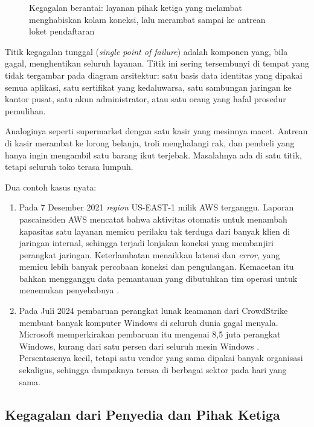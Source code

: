 \begin{figure}[!htb]
  \centering
  
  \caption{Kegagalan berantai: layanan pihak ketiga yang melambat menghabiskan kolam koneksi, lalu
           merambat sampai ke antrean loket pendaftaran}
  \label{fig:ch12-kegagalan-berantai}
\end{figure}

Titik kegagalan tunggal (\textit{single point of failure}) adalah komponen yang, bila gagal,
menghentikan seluruh layanan. Titik ini sering tersembunyi di tempat yang tidak tergambar pada
diagram arsitektur: satu basis data identitas yang dipakai semua aplikasi, satu sertifikat yang
kedaluwarsa, satu sambungan jaringan ke kantor pusat, satu akun administrator, atau satu orang yang
hafal prosedur pemulihan.

Analoginya seperti supermarket dengan satu kasir yang mesinnya macet. Antrean di kasir merambat ke
lorong belanja, troli menghalangi rak, dan pembeli yang hanya ingin mengambil satu barang ikut
terjebak. Masalahnya ada di satu titik, tetapi seluruh toko terasa lumpuh.

Dua contoh kasus nyata:
\begin{enumerate}
  \item Pada 7 Desember 2021 \textit{region} US-EAST-1 milik AWS terganggu. Laporan pascainsiden
        AWS mencatat bahwa aktivitas otomatis untuk menambah kapasitas satu layanan memicu
        perilaku tak terduga dari banyak klien di jaringan internal, sehingga terjadi lonjakan
        koneksi yang membanjiri perangkat jaringan. Keterlambatan menaikkan latensi dan
        \textit{error}, yang memicu lebih banyak percobaan koneksi dan pengulangan. Kemacetan itu
        bahkan mengganggu data pemantauan yang dibutuhkan tim operasi untuk menemukan penyebabnya
        \cite{c12-aws-event2021}.
  \item Pada Juli 2024 pembaruan perangkat lunak keamanan dari CrowdStrike membuat banyak komputer
        Windows di seluruh dunia gagal menyala. Microsoft memperkirakan pembaruan itu mengenai
        8,5 juta perangkat Windows, kurang dari satu persen dari seluruh mesin Windows
        \cite{c12-weston2024}. Persentasenya kecil, tetapi satu vendor yang sama dipakai banyak
        organisasi sekaligus, sehingga dampaknya terasa di berbagai sektor pada hari yang sama.
\end{enumerate}

\subsection{Kegagalan dari Penyedia dan Pihak Ketiga}

